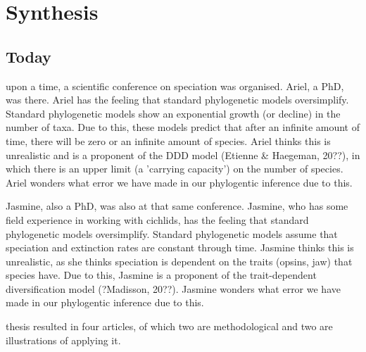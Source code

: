 \chapter{Synthesis}
\label{synthesis}

\newpage



\section{Today}

\noindent 
{} upon a time, a scientific conference on speciation was
organised. Ariel, a PhD, was there. 
Ariel has the feeling that standard phylogenetic models
oversimplify. Standard phylogenetic models show
an exponential growth (or decline) in the number of taxa.
Due to this, these models predict that after an
infinite amount of time, there will be zero or an infinite amount of species.
Ariel thinks this is unrealistic and is a proponent of the DDD 
model (Etienne & Haegeman, 20??), in which there is an upper limit (a
'carrying capacity') on the number of species. Ariel wonders what
error we have made in our phylogentic inference due to this.

Jasmine, also a PhD, was also at that same conference. Jasmine, who
has some field experience in working with cichlids, 
has the feeling that standard phylogenetic models
oversimplify. Standard phylogenetic models assume that speciation and
extinction rates are constant through time. 
Jasmine thinks this is unrealistic, as she thinks 
speciation is dependent on the traits (opsins, jaw) that species have.
Due to this, Jasmine is a proponent of the trait-dependent
diversification model (?Madisson, 20??). Jasmine wonders what
error we have made in our phylogentic inference due to this.






thesis resulted in four articles,
of which two are methodological and two are illustrations
of applying it. 

